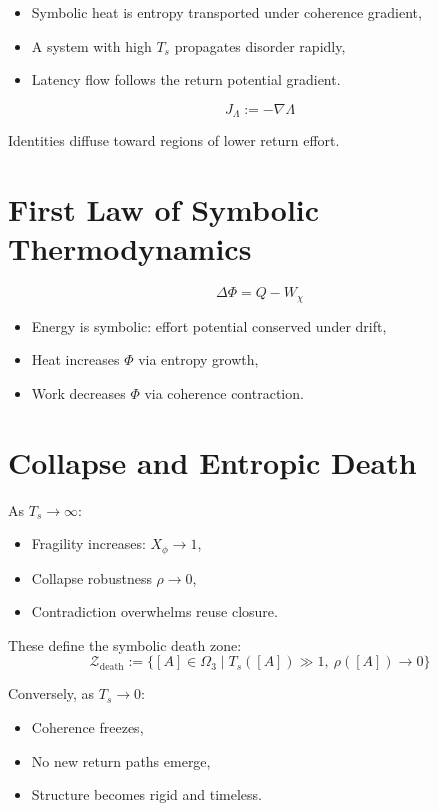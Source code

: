 \begin{itemize}
  \item Symbolic heat is entropy transported under coherence gradient,
  \item A system with high $T_s$ propagates disorder rapidly,
  \item Latency flow follows the return potential gradient.
\end{itemize}

\begin{definition}
\[
J_\Lambda := -\nabla\Lambda
\]
\end{definition}

Identities diffuse toward regions of lower return effort.

\section{First Law of Symbolic Thermodynamics} \label{sec:first-law}

\begin{proposition}
\[
\Delta \Phi = Q - W_\chi
\]
\end{proposition}

\begin{itemize}
  \item Energy is symbolic: effort potential conserved under drift,
  \item Heat increases $\Phi$ via entropy growth,
  \item Work decreases $\Phi$ via coherence contraction.
\end{itemize}

\section{Collapse and Entropic Death} \label{sec:collapse}

As $T_s \to \infty$:
\begin{itemize}
  \item Fragility increases: $X_\phi \to 1$,
  \item Collapse robustness $\rho \to 0$,
  \item Contradiction overwhelms reuse closure.
\end{itemize}

These define the symbolic death zone:
\[
\mathcal{Z}_{\text{death}} := \{ [A] \in \Omega_3 \mid T_s([A]) \gg 1,\ \rho([A]) \to 0 \}
\]

Conversely, as $T_s \to 0$:
\begin{itemize}
  \item Coherence freezes,
  \item No new return paths emerge,
  \item Structure becomes rigid and timeless.
\end{itemize}


